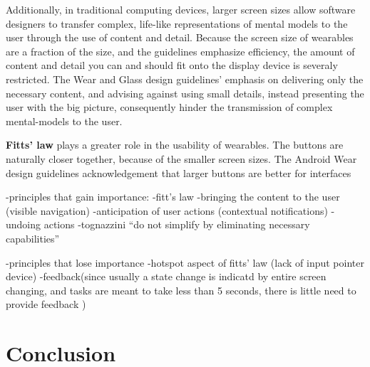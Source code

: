 \documentclass[12pt]{article}
\begin{document}
Additionally, in traditional computing devices, larger screen sizes allow software designers to transfer complex, life-like representations of mental models to the user through the use of content and detail. Because the screen size of wearables are a fraction of the size, and the guidelines emphasize efficiency, the amount of content and detail you can and should fit onto the display device is severaly restricted. The Wear and Glass design guidelines' emphasis on delivering only the necessary content, and advising against using small details, instead presenting the user with the big picture, consequently hinder the transmission of complex mental-models to the user.

\textbf{Fitts' law} plays a greater role in the usability of wearables. The buttons are naturally closer together, because of the smaller screen sizes. The Android Wear design guidelines acknowledgement that larger buttons are better for interfaces

-principles that gain importance:
	-fitt's law
	-bringing the content to the user (visible navigation)
	-anticipation of user actions (contextual notifications)
	-undoing actions
	-tognazzini ``do not simplify by eliminating necessary capabilities''
	
-principles that lose importance
	-hotspot aspect of fitts' law (lack of input pointer device)
	-feedback(since usually a state change is indicatd by entire screen changing, and tasks are meant to take less than 5 seconds, there is little need to provide feedback )

\section{Conclusion}



\end{document}
